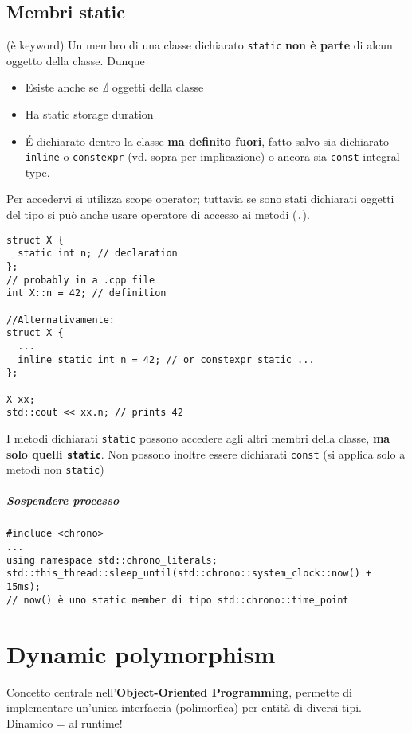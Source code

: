\documentclass[10pt, oneside]{Book}
\begin{document}
\section{Membri static}
(è keyword) Un membro di una classe dichiarato \texttt{static} \textbf{non è parte} di alcun oggetto della classe. Dunque
\begin{itemize}
\item Esiste anche se $\nexists$ oggetti della classe
\item Ha static storage duration
\item \'E dichiarato dentro la classe \textbf{ma definito fuori}, fatto salvo sia dichiarato \texttt{inline} o \texttt{constexpr} (vd. sopra per implicazione) o ancora sia \texttt{const} integral type.
\end{itemize}
Per accedervi si utilizza scope operator; tuttavia se sono stati dichiarati oggetti del tipo si può anche usare operatore di accesso ai metodi (\texttt{.}).
\begin{verbatim}
struct X {
  static int n; // declaration
};
// probably in a .cpp file
int X::n = 42; // definition

//Alternativamente:
struct X {
  ...
  inline static int n = 42; // or constexpr static ...
};

X xx;
std::cout << xx.n; // prints 42
\end{verbatim}
I metodi dichiarati \texttt{static} possono accedere agli altri membri della classe, \textbf{ma solo quelli \texttt{static}}. Non possono inoltre essere dichiarati \texttt{const} (si applica solo a metodi non \texttt{static})
\paragraph{Sospendere processo}
\begin{verbatim}
#include <chrono>
...
using namespace std::chrono_literals;
std::this_thread::sleep_until(std::chrono::system_clock::now() + 15ms);
// now() è uno static member di tipo std::chrono::time_point
\end{verbatim}

\chapter{Dynamic polymorphism}
Concetto centrale nell'\textbf{Object-Oriented Programming}, permette di implementare un'unica interfaccia (polimorfica) per entità di diversi tipi. Dinamico = al runtime!
\end{document}
